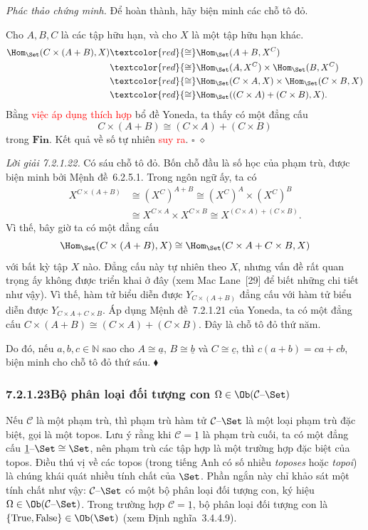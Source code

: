 \noindent\textit{Phác thảo chứng minh.}
Để hoàn thành, hãy biện minh các chỗ tô đỏ.

Cho $A,B,C$ là các tập hữu hạn, và cho $X$ là một tập hữu hạn khác.
\[
\begin{aligned}
\Hom_{\Set}(C\times(A+B),X)&\textcolor{red}{\cong}\Hom_{\Set}(A+B,X^C)\\
&\textcolor{red}{\cong}\Hom_{\Set}(A,X^C)\times\Hom_{\Set}(B,X^C)\\
&\textcolor{red}{\cong}\Hom_{\Set}(C\times A,X)\times\Hom_{\Set}(C\times B,X)\\
&\textcolor{red}{\cong}\Hom_{\Set}((C\times A)+(C\times B),X).
\end{aligned}
\]
Bằng \textcolor{red}{việc áp dụng thích hợp} bổ đề Yoneda, ta thấy có một đẳng cấu
\[
C\times(A+B)\cong(C\times A)+(C\times B)
\]
trong $\mathbf{Fin}$. Kết quả về số tự nhiên \textcolor{red}{suy ra}.
\hfill$\square$
\hfill$\diamond$

\noindent\textit{Lời giải 7.2.1.22.}\keepwithnext
Có sáu chỗ tô đỏ. Bốn chỗ đầu là số học của phạm trù, được biện minh bởi Mệnh đề~6.2.5.1. Trong ngôn ngữ ấy, ta có
\[
\begin{aligned}
X^{C\times(A+B)}&\cong(X^C)^{A+B}\cong(X^C)^A\times(X^C)^B\\
&\cong X^{C\times A}\times X^{C\times B}\cong X^{(C\times A)+(C\times B)}.
\end{aligned}
\]
Vì thế, bây giờ ta có một đẳng cấu
\[
\Hom_{\Set}(C\times(A+B),X)\cong\Hom_{\Set}(C\times A+C\times B,X)
\]
với bất kỳ tập $X$ nào. Đẳng cấu này tự nhiên theo $X$, nhưng vấn đề rất quan trọng ấy không được triển khai ở đây (xem Mac Lane~[29] để biết những chi tiết như vậy). Vì thế, hàm tử biểu diễn được $Y_{C\times(A+B)}$ đẳng cấu với hàm tử biểu diễn được $Y_{C\times A+C\times B}$. Áp dụng Mệnh đề~7.2.1.21 của Yoneda, ta có một đẳng cấu $C\times(A+B)\cong(C\times A)+(C\times B)$. Đây là chỗ tô đỏ thứ năm.

Do đó, nếu $a,b,c\in\mathbb N$ sao cho $A\cong\underline a$, $B\cong\underline b$ và $C\cong\underline c$, thì $c(a+b)=ca+cb$, biện minh cho chỗ tô đỏ thứ sáu.
\hfill$\blacklozenge$

\subsubsection*{7.2.1.23\quad Bộ phân loại đối tượng con $\Omega\in\Ob(\mathcal C\text{--}\Set)$}

Nếu $\mathcal C$ là một phạm trù, thì phạm trù hàm tử $\mathcal C\text{--}\Set$ là một loại phạm trù đặc biệt, gọi là một topos. Lưu ý rằng khi $\mathcal C=\underline1$ là phạm trù cuối, ta có một đẳng cấu $\underline1\text{--}\Set\cong\Set$, nên phạm trù các tập hợp là một trường hợp đặc biệt của topos. Điều thú vị về các topos (trong tiếng Anh có số nhiều \emph{toposes} hoặc \emph{topoi}) là chúng khái quát nhiều tính chất của $\Set$. Phần ngắn này chỉ khảo sát một tính chất như vậy: $\mathcal C\text{--}\Set$ có một bộ phân loại đối tượng con, ký hiệu $\Omega\in\Ob(\mathcal C\text{--}\Set)$. Trong trường hợp $\mathcal C=\underline1$, bộ phân loại đối tượng con là $\{\mathrm{True},\mathrm{False}\}\in\Ob(\Set)$ (xem Định nghĩa~3.4.4.9).

